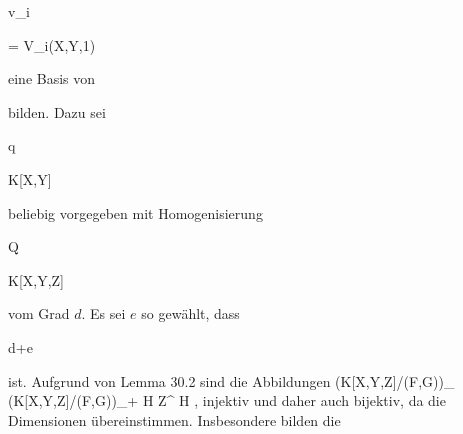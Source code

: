 {\mavergleichskettedisp

{\vergleichskette

{ v_i
}

{ =} { V_i(X,Y,1)
}

{ } {
}

{ } {
}

{ } {
}

}
{}{}{}
eine Basis von

 bilden. Dazu sei


\mavergleichskette

{\vergleichskette

{ q
}

{ \in }{ K[X,Y]
}

{  }{
}

{    }{
}

{   }{
}

}
{}{}{}
beliebig vorgegeben mit Homogenisierung


\mavergleichskette

{\vergleichskette

{ Q
}

{ \in }{ K[X,Y,Z]
}

{  }{
}

{    }{
}

{   }{
}

}
{}{}{}
vom Grad $d$. Es sei $e$ so gewählt, dass


\mavergleichskette

{\vergleichskette

{ d+e
}

{ \geq }{ \ell
}

{  }{
}

{    }{
}

{   }{
}

}
{}{}{}
ist. Aufgrund von
Lemma 30.2
sind die Abbildungen
 {} {}
\maabbeledisp {} {(K[X,Y,Z]/(F,G))_\ell } { (K[X,Y,Z]/(F,G))_{\ell+\lambda}
} { H } { Z^{\lambda} H
} {,}
injektiv und daher auch bijektiv, da die Dimensionen übereinstimmen. Insbesondere bilden die


}
